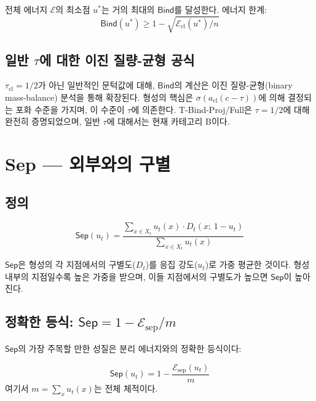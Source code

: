 \begin{theorem}
\label{thm:t-bind-full}
전체 에너지 $\mathcal{E}$의 최소점 $u^*$는 거의 최대의 $\mathsf{Bind}$를 달성한다. 에너지 한계:
\begin{equation}
    \mathsf{Bind}(u^*) \geq 1 - \sqrt{\mathcal{E}_{\mathrm{cl}}(u^*) / n}
    \label{eq:bind-energy}
\end{equation}
\end{theorem}

\subsection{일반 $\tau$에 대한 이진 질량-균형 공식}

$\tau_{\mathrm{cl}} = 1/2$가 아닌 일반적인 문턱값에 대해, $\mathsf{Bind}$의 계산은 이진 질량-균형(binary mass-balance) 분석을 통해 확장된다. 형성의 핵심은 $\sigma(a_{\mathrm{cl}}(c - \tau))$에 의해 결정되는 포화 수준을 가지며, 이 수준이 $\tau$에 의존한다. T-Bind-Proj/Full은 $\tau = 1/2$에 대해 완전히 증명되었으며, 일반 $\tau$에 대해서는 현재 카테고리 B이다.


\section{Sep --- 외부와의 구별}
\label{sec:sep}

\subsection{정의}

\begin{equation}
    \mathsf{Sep}(u_t) = \frac{\sum_{x \in X_t} u_t(x) \cdot D_t(x;\, 1-u_t)}{\sum_{x \in X_t} u_t(x)}
    \label{eq:sep}
\end{equation}

$\mathsf{Sep}$은 형성의 각 지점에서의 구별도($D_t$)를 응집 강도($u_t$)로 가중 평균한 것이다. 형성 내부의 지점일수록 높은 가중을 받으며, 이들 지점에서의 구별도가 높으면 $\mathsf{Sep}$이 높아진다.

\subsection{정확한 등식: $\mathsf{Sep} = 1 - \mathcal{E}_{\mathrm{sep}} / m$}

$\mathsf{Sep}$의 가장 주목할 만한 성질은 분리 에너지와의 정확한 등식이다:

\begin{theorem}
\label{thm:sep-energy-bridge}
\begin{equation}
    \mathsf{Sep}(u_t) = 1 - \frac{\mathcal{E}_{\mathrm{sep}}(u_t)}{m}
    \label{eq:sep-identity}
\end{equation}
여기서 $m = \sum_x u_t(x)$는 전체 체적이다.
\end{theorem}

